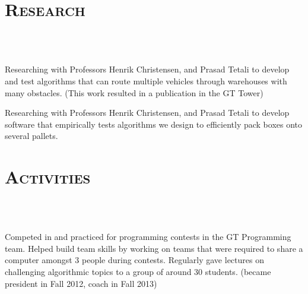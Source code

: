 \begin{resume}
\section{\textsc{Research}}

\begin{formatb}
  \\
  \body\\
\end{formatb}

\begin{position}
Researching with Professors Henrik Christensen, and Prasad Tetali to develop and test algorithms that can route multiple vehicles through warehouses with many obstacles. (This work resulted in a publication in the GT Tower)
\end{position}

\begin{position}
Researching with Professors Henrik Christensen, and Prasad Tetali to develop software that empirically tests algorithms we design to efficiently pack boxes onto several pallets.
\end{position}


\section{\textsc{Activities}}

\begin{formatb}
  \\
  \body\\
\end{formatb}

\begin{position}
Competed in and practiced for programming contests in the GT Programming team. Helped build team skills by working on teams that were required to share a computer amongst 3 people during contests. Regularly gave lectures on challenging algorithmic topics to a group of around 30 students. (became president in Fall 2012, coach in Fall 2013)
\end{position}


\end{resume}
